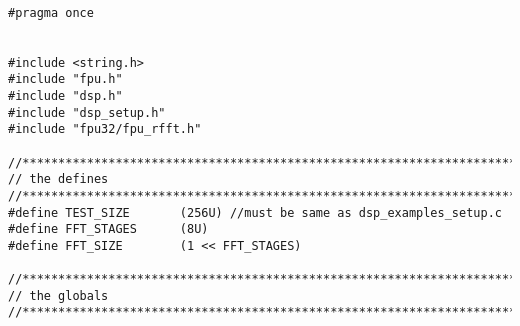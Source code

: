\begin{lstlisting}[caption=\raggedright{mcu-libs/RLS.h}, frame=single]

#pragma once


#include <string.h>
#include "fpu.h"
#include "dsp.h"
#include "dsp_setup.h"
#include "fpu32/fpu_rfft.h"

//*****************************************************************************
// the defines
//*****************************************************************************
#define TEST_SIZE       (256U) //must be same as dsp_examples_setup.c
#define FFT_STAGES      (8U)
#define FFT_SIZE        (1 << FFT_STAGES)

//*****************************************************************************
// the globals
//*****************************************************************************


\end{lstlisting}
